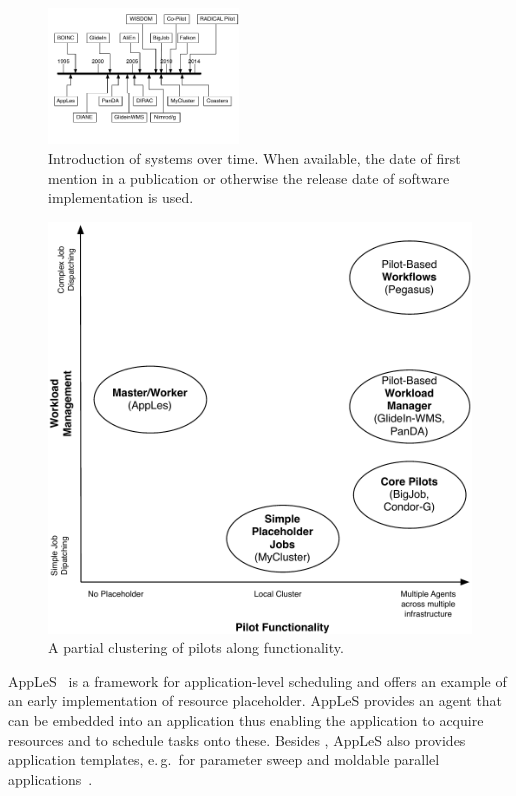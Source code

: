 \documentclass{sig-alternate}
\begin{document}

\begin{figure}[t]
  \centering
    \includegraphics[width=0.45\textwidth]{figures/timeline}
    \caption{Introduction of systems over time. When available, the date of
      first mention in a publication or otherwise the release date of software
      implementation is used.  }
    \label{fig:timeline}
\end{figure}



\begin{figure}[t]
  \centering
    \includegraphics[width=.45\textwidth]{figures/pilotjob-clustering.pdf}
    \caption{A partial clustering of pilots along functionality.  }
  \label{fig:pilotjob_clustering}
\end{figure}

AppLeS~\cite{berman1996application} is a framework for application-level
scheduling and offers an example of an early implementation of resource
placeholder. AppLeS provides an agent that can be embedded into an application
thus enabling the application to acquire resources and to schedule tasks onto
these. Besides \MW, AppLeS also provides application templates, e.\,g.\ for
parameter sweep and moldable parallel applications~\cite{berman2003adaptive}.
\end{document}
